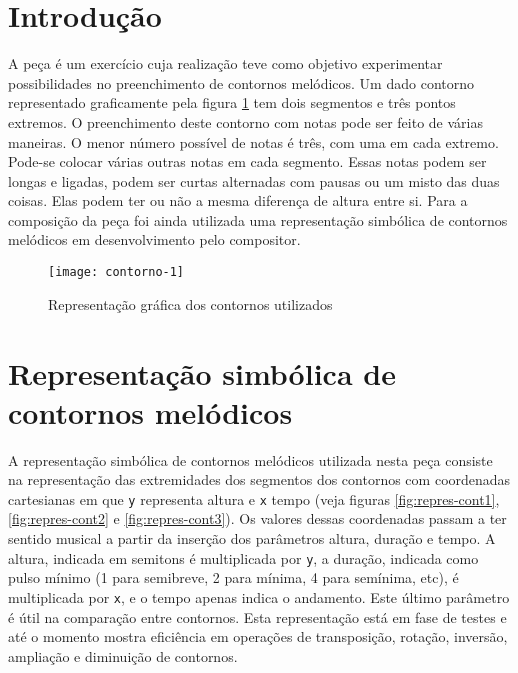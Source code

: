\documentclass[12pt]{article}
\begin{document}
\graphicspath{{figs-out/}}



\section{Introdução}
\label{sec:introducao}

A peça  é um
exercício cuja realização teve como objetivo experimentar
possibilidades no preenchimento de contornos melódicos. Um dado
contorno representado graficamente pela figura \ref{fig:contorno-1}
tem dois segmentos e três pontos extremos. O preenchimento deste
contorno com notas pode ser feito de várias maneiras. O menor número
possível de notas é três, com uma em cada extremo. Pode-se colocar
várias outras notas em cada segmento. Essas notas podem ser longas e
ligadas, podem ser curtas alternadas com pausas ou um misto das duas
coisas. Elas podem ter ou não a mesma diferença de altura entre si.
Para a composição da peça foi ainda utilizada uma representação
simbólica de contornos melódicos em desenvolvimento pelo compositor.

\begin{figure}[h]
  \centering
  \texttt{[image: contorno-1]}
  \caption{Representação gráfica dos contornos utilizados}
  \label{fig:contorno-1}
\end{figure}

\section{Representação simbólica de contornos melódicos}
\label{sec:repr-simb-de}

A representação simbólica de contornos melódicos utilizada nesta peça
consiste na representação das extremidades dos segmentos dos contornos
com coordenadas cartesianas em que \texttt{y} representa altura e
\texttt{x} tempo (veja figuras \ref{fig:repres-cont1},
\ref{fig:repres-cont2} e \ref{fig:repres-cont3}). Os valores dessas
coordenadas passam a ter sentido musical a partir da inserção dos
parâmetros altura, duração e tempo. A altura, indicada em semitons é
multiplicada por \texttt{y}, a duração, indicada como pulso mínimo (1
para semibreve, 2 para mínima, 4 para semínima, etc), é multiplicada
por \texttt{x}, e o tempo apenas indica o andamento. Este último
parâmetro é útil na comparação entre contornos. Esta representação
está em fase de testes e até o momento mostra eficiência em operações
de transposição, rotação, inversão, ampliação e diminuição de
contornos.
\end{document}
